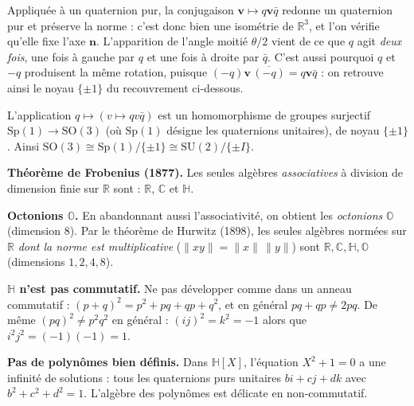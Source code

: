\begin{significationintuitive}
  Appliquée à un quaternion pur, la conjugaison $\mathbf{v}\mapsto q\mathbf{v}\bar{q}$
  redonne un quaternion pur et préserve la norme : c'est donc bien une isométrie
  de $\mathbb{R}^3$, et l'on vérifie qu'elle fixe l'axe $\mathbf{n}$. L'apparition
  de l'angle moitié $\theta/2$ vient de ce que $q$ agit \emph{deux fois}, une fois
  à gauche par $q$ et une fois à droite par $\bar{q}$. C'est aussi pourquoi $q$ et
  $-q$ produisent la même rotation, puisque $(-q)\mathbf{v}\,\overline{(-q)} = q\mathbf{v}\bar{q}$ :
  on retrouve ainsi le noyau $\{\pm 1\}$ du recouvrement ci-dessous.
\end{significationintuitive}

L'application $q \mapsto (v \mapsto qv\bar{q})$ est un homomorphisme de groupes
surjectif $\mathrm{Sp}(1) \to \mathrm{SO}(3)$ (où $\mathrm{Sp}(1)$ désigne les
quaternions unitaires), de noyau $\{\pm 1\}$.
Ainsi $\mathrm{SO}(3) \cong \mathrm{Sp}(1)/\{\pm 1\} \cong \mathrm{SU}(2)/\{\pm I\}$.

\decsep{}



\begin{mdframed}[style=exbar]
  \textbf{Théorème de Frobenius (1877).}\enspace%
  Les seules algèbres \emph{associatives} à division de dimension finie sur
  $\mathbb{R}$ sont : $\mathbb{R}$, $\mathbb{C}$ et $\mathbb{H}$.

  \smallskip\noindent
  \textbf{Octonions $\mathbb{O}$.}\enspace%
  En abandonnant aussi l'associativité, on obtient les \emph{octonions} $\mathbb{O}$
  (dimension $8$). Par le théorème de Hurwitz (1898), les seules algèbres
  normées sur $\mathbb{R}$ \emph{dont la norme est multiplicative}
  ($\lVert xy\rVert = \lVert x\rVert\,\lVert y\rVert$) sont
  $\mathbb{R}, \mathbb{C}, \mathbb{H}, \mathbb{O}$
  (dimensions $1, 2, 4, 8$).
\end{mdframed}

\vspace{6pt}

\begin{mdframed}[style=cexbar]
  \textbf{$\mathbb{H}$ n'est pas commutatif.}\enspace%
  Ne pas développer comme dans un anneau commutatif :
  $(p+q)^2 = p^2 + pq + qp + q^2$, et en général $pq + qp \neq 2pq$.
  De même $(pq)^2 \neq p^2q^2$ en général : $(ij)^2 = k^2 = -1$
  alors que $i^2j^2 = (-1)(-1) = 1$.

  \smallskip\noindent
  \textbf{Pas de polynômes bien définis.}\enspace%
  Dans $\mathbb{H}[X]$, l'équation $X^2 + 1 = 0$ a une infinité de solutions :
  tous les quaternions purs unitaires $bi+cj+dk$ avec $b^2+c^2+d^2=1$.
  L'algèbre des polynômes est délicate en non-commutatif.
\end{mdframed}

